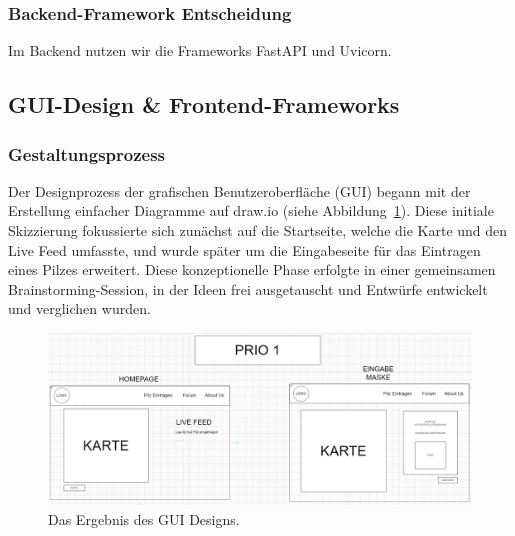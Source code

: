 \documentclass[../main.tex]{subfiles} %
\begin{document}
\subsubsection{Backend-Framework Entscheidung}

Im Backend nutzen wir die Frameworks FastAPI und Uvicorn.

\subsection{GUI-Design \& Frontend-Frameworks} %

\subsubsection{Gestaltungsprozess}

Der Designprozess der grafischen Benutzeroberfläche (GUI) begann mit der Erstellung einfacher Diagramme auf draw.io
(siehe Abbildung~\ref{fig:GUI_Entwurf}). Diese initiale Skizzierung fokussierte sich zunächst auf die Startseite, welche
die Karte und den Live Feed umfasste, und wurde später um die Eingabeseite für das Eintragen eines Pilzes erweitert. Diese
konzeptionelle Phase erfolgte in einer gemeinsamen Brainstorming-Session, in der Ideen frei ausgetauscht und Entwürfe
entwickelt und verglichen wurden.

\begin{figure}[htbp]
	\centering
	\includegraphics[width=\textwidth]{../abbildungen/GUI_Entwurf_Drawio.jpg}
	\caption{Das Ergebnis des GUI Designs.}\label{fig:GUI_Entwurf}
\end{figure}
\end{document}
